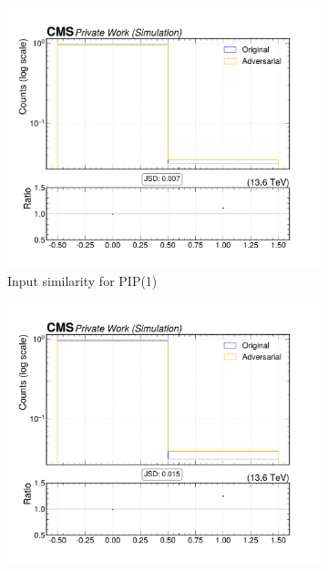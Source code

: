 \begin{figure}[htbp]
  \centering
  \begin{subfigure}[t]{0.32\textwidth}
    \includegraphics[width=\linewidth]{media/output/features/compare/intprob_1/cmp_npf_arr_Npfcan_HadFrac.pdf}
    \caption{Input similarity for PIP(1)}
  \end{subfigure}\hfill
  \begin{subfigure}[t]{0.32\textwidth}
    \includegraphics[width=\linewidth]{media/output/features/compare/intprob_2/cmp_npf_arr_Npfcan_HadFrac.pdf}

\end{subfigure}
\end{figure}
